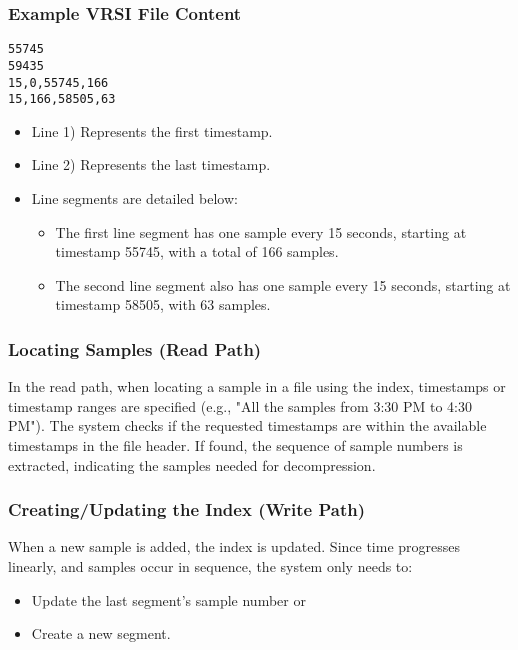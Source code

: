 \documentclass[conference]{IEEEtran}
\begin{document}
\subsubsection{Example VRSI File Content}

\begin{verbatim}
55745 
59435 
15,0,55745,166 
15,166,58505,63
\end{verbatim}

\begin{itemize}
    \item Line 1) Represents the first timestamp.
    \item Line 2) Represents the last timestamp.
    \item Line segments are detailed below:
    \begin{itemize}
        \item The first line segment has one sample every 15 seconds, starting at timestamp 55745, with a total of 166 samples.
        \item The second line segment also has one sample every 15 seconds, starting at timestamp 58505, with 63 samples.
    \end{itemize}
\end{itemize}

\subsubsection{Locating Samples (Read Path)}

In the read path, when locating a sample in a file using the index, timestamps or timestamp ranges are specified (e.g., "All the samples from 3:30 PM to 4:30 PM"). The system checks if the requested timestamps are within the available timestamps in the file header. If found, the sequence of sample numbers is extracted, indicating the samples needed for decompression.

\subsubsection{Creating/Updating the Index (Write Path)}

When a new sample is added, the index is updated. Since time progresses linearly, and samples occur in sequence, the system only needs to:
\begin{itemize}
    \item Update the last segment's sample number or
    \item Create a new segment.
\end{itemize}
\end{document}
